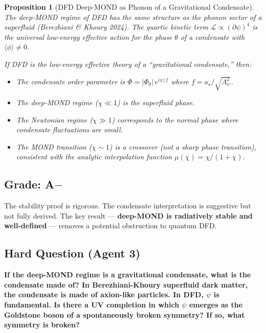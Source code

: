 \documentclass[11pt,a4paper]{article}
\newtheorem{proposition}{Proposition}
\begin{document}
\begin{proposition}[DFD Deep-MOND as Phonon of a Gravitational Condensate]
\label{prop:condensate}
The deep-MOND regime of DFD has the same structure as the phonon sector of a superfluid (Berezhiani \& Khoury 2024). The quartic kinetic term $\mathcal{L} \propto (\partial\psi)^4$ is the universal low-energy effective action for the phase $\theta$ of a condensate with $\langle\phi\rangle \neq 0$.

If DFD is the low-energy effective theory of a ``gravitational condensate,'' then:
\begin{itemize}
\item The condensate order parameter is $\Phi = |\Phi_0|\,e^{i\psi/f}$ where $f = a_\star/\sqrt{\Lambda_\psi^2}$.
\item The deep-MOND regime ($\chi \ll 1$) is the superfluid phase.
\item The Newtonian regime ($\chi \gg 1$) corresponds to the normal phase where condensate fluctuations are small.
\item The MOND transition ($\chi \sim 1$) is a crossover (not a sharp phase transition), consistent with the analytic interpolation function $\mu(\chi) = \chi/(1+\chi)$.
\end{itemize}
\end{proposition}

\subsection{Grade: A$-$}

The stability proof is rigorous. The condensate interpretation is suggestive but not fully derived. The key result --- \textbf{deep-MOND is radiatively stable and well-defined} --- removes a potential obstruction to quantum DFD.

\subsection{Hard Question (Agent 3)}

\textbf{If the deep-MOND regime is a gravitational condensate, what is the condensate made of? In Berezhiani-Khoury superfluid dark matter, the condensate is made of axion-like particles. In DFD, $\psi$ is fundamental. Is there a UV completion in which $\psi$ emerges as the Goldstone boson of a spontaneously broken symmetry? If so, what symmetry is broken?}

\newpage

\end{document}
